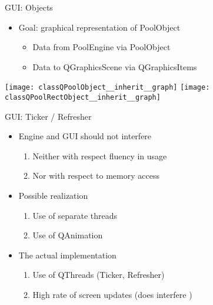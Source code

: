 \documentclass{beamer}
\begin{document}
\begin{frame}{GUI: Objects}
	\begin{itemize}
		\item Goal: graphical representation of PoolObject
		\begin{itemize}
			\item Data from PoolEngine via PoolObject
			\item Data to QGraphicsScene via QGraphicsItems
		\end{itemize}
	\end{itemize}
	\begin{center}
		\texttt{[image: classQPoolObject\_\_inherit\_\_graph]}
		\texttt{[image: classQPoolRectObject\_\_inherit\_\_graph]}
	\end{center}
\end{frame}

\begin{frame}{GUI: Ticker / Refresher}
	\begin{itemize}
		\item Engine and GUI should not interfere
		\begin{enumerate}
			\item Neither with respect fluency in usage
			\item Nor with respect to memory access
		\end{enumerate}
		
		\vspace*{1em}
		\item Possible realization
		\begin{enumerate}
			\item Use of separate threads
			\item Use of QAnimation
		\end{enumerate}
		
		\vspace*{1em}
		\item The actual implementation
		\begin{enumerate}
			\item Use of QThreads (Ticker, Refresher)
			\item High rate of screen updates (does interfere {\large \frownie{}})
		\end{enumerate}
	\end{itemize}
\end{frame}
\end{document}
